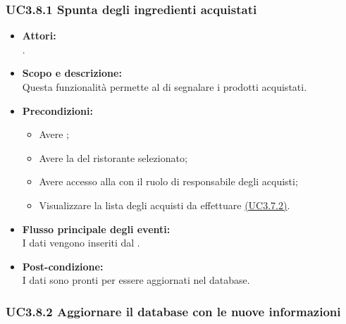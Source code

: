 \subsubsection{UC3.8.1 Spunta degli ingredienti acquistati} \label{UC3.8.1}

\begin{itemize}
	\item \textbf{Attori:}
	\\.
	\item \textbf{Scopo e descrizione:} 
	\\Questa funzionalità permette al  di segnalare i prodotti acquistati.
	\item \textbf{Precondizioni:}
	\begin{itemize}
		\item Avere ;
		\item Avere la  del ristorante selezionato;
		\item Avere accesso alla  con il ruolo di responsabile degli acquisti;
		\item Visualizzare la lista degli acquisti da effettuare \hyperref[UC3.7.2]{(UC3.7.2)}.
	\end{itemize}
	\item \textbf{Flusso principale degli eventi:}
	\\I dati vengono inseriti dal .
	\item \textbf{Post-condizione:}
	\\I dati sono pronti per essere aggiornati nel database.
\end{itemize}

\subsubsection{UC3.8.2 Aggiornare il database con le nuove informazioni} \label{UC3.8.2}

